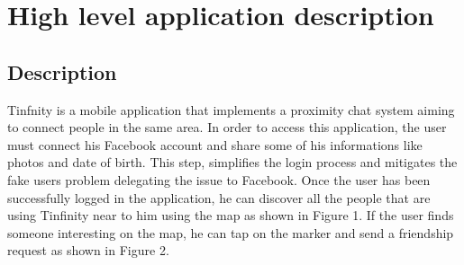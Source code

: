 
\section{High level application description}

\subsection{Description}
Tinfnity is a mobile application that implements a proximity chat system aiming to connect people in the same area. In order to access this application, the user must connect his Facebook account and share some of his informations like photos and date of birth. This step, simplifies the login process and mitigates the fake users problem delegating the issue to Facebook. Once the user has been successfully logged in the application, he can discover all the people that are using Tinfinity near to him using the map as shown in Figure 1. If the user finds someone interesting on the map, he can tap on the marker and send a friendship request as shown in Figure 2.

